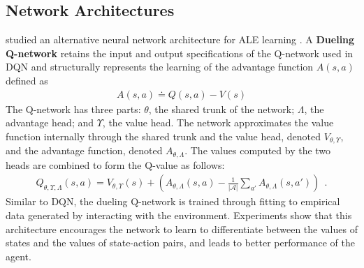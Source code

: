 \subsection{Network Architectures}
\citeauthor{DuelingNetworkArchitectures_Wang.Schaul.ea_2016} studied an alternative neural network architecture for ALE learning \cite{DuelingNetworkArchitectures_Wang.Schaul.ea_2016}.
A \textbf{Dueling Q-network} retains the input and output specifications of the Q-network used in DQN and structurally represents the learning of the advantage function $A(s, a)$ defined as
\begin{align*}
    A(s, a) \doteq Q(s, a) - V(s)
\end{align*}
The Q-network has three parts:
$\theta$, the shared trunk of the network; $\varLambda$, the advantage head; and $\varUpsilon$, the value head.
The network approximates the value function internally through the shared trunk and the value head, denoted $V_{\theta, \varUpsilon}$, and the advantage function, denoted $A_{\theta, \varLambda}$.
The values computed by the two heads are combined to form the Q-value as follows:
\begin{align*}
    Q_{\theta, \varUpsilon, \varLambda}(s, a)
    = V_{\theta, \varUpsilon}(s)
    + \left( A_{\theta, \varLambda}(s, a)
    - \frac{1}{| \mathcal{A} | } \sum_{a'}A_{\theta, \varLambda}(s, a') \right)  ~~ .
\end{align*}
Similar to DQN, the dueling Q-network is trained through fitting to empirical data generated by interacting with the environment.
Experiments show that this architecture encourages the network to learn to differentiate between the values of states and the values of state-action pairs, and leads to better performance of the agent.


